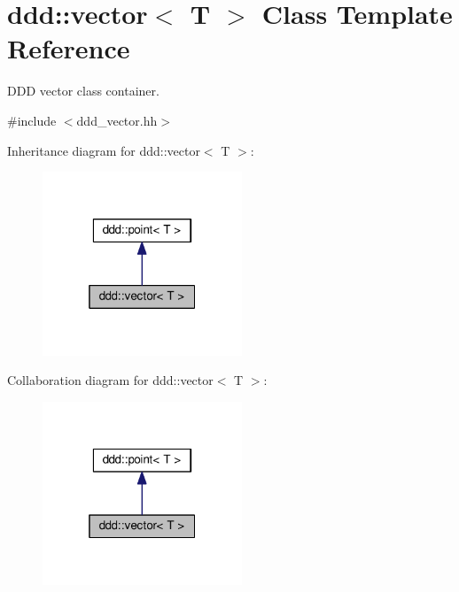 \hypertarget{classddd_1_1vector}{}\section{ddd\+:\+:vector$<$ T $>$ Class Template Reference}
\label{classddd_1_1vector}


D\+DD vector class container.  




{\ttfamily \#include $<$ddd\+\_\+vector.\+hh$>$}



Inheritance diagram for ddd\+:\+:vector$<$ T $>$\+:
\nopagebreak
\begin{figure}[H]
\begin{center}
\leavevmode
\includegraphics[width=169pt]{d6/df3/classddd_1_1vector__inherit__graph}
\end{center}
\end{figure}


Collaboration diagram for ddd\+:\+:vector$<$ T $>$\+:
\nopagebreak
\begin{figure}[H]
\begin{center}
\leavevmode
\includegraphics[width=169pt]{d3/d01/classddd_1_1vector__coll__graph}
\end{center}
\end{figure}
